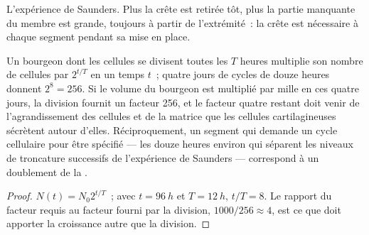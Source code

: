 \begin{omfigure}

{\small L'expérience de Saunders. Plus la crête est retirée tôt, plus la
partie manquante du membre est grande, toujours à partir de
l'extrémité~: la crête est nécessaire à chaque segment pendant sa mise
en place.}
\end{omfigure}

\begin{theorem}\label{thm:b2:limb-organogenesis:growth}
Un bourgeon dont les cellules se divisent toutes les $T$ heures
multiplie son nombre de cellules par $2^{t/T}$ en un temps $t$~; quatre
jours de cycles de douze heures donnent $2^{8} = 256$. Si le volume du
bourgeon est multiplié par mille en ces quatre jours, la division fournit
un facteur 256, et le facteur quatre restant doit venir de
l'agrandissement des cellules et de la matrice que les cellules
cartilagineuses sécrètent autour d'elles. Réciproquement, un segment qui
demande un cycle cellulaire pour être spécifié --- les douze heures
environ qui séparent les niveaux de troncature successifs de
l'expérience de Saunders --- correspond à un doublement de la .
\end{theorem}
\begin{proof}
$N(t) = N_0 2^{t/T}$~; avec $t = \qty{96}{h}$ et $T = \qty{12}{h}$,
$t/T = 8$. Le rapport du facteur requis au facteur fourni par la
division,
$1000/256 \approx 4$, est ce que doit apporter la croissance autre que
la division.
\end{proof}

